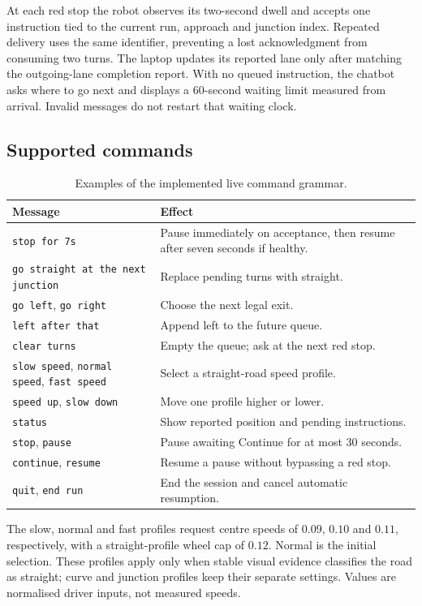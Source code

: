 \documentclass[10pt,a4paper,twocolumn]{article}
\newcommand{\code}[1]{\texttt{#1}}
\begin{document}
At each red stop the robot observes its two-second dwell and accepts one
instruction tied to the current run, approach and junction index. Repeated
delivery uses the same identifier, preventing a lost acknowledgment from
consuming two turns. The laptop updates its reported lane only after matching
the outgoing-lane completion report. With no queued instruction, the chatbot
asks where to go next and displays a 60-second waiting limit measured from
arrival. Invalid messages do not restart that waiting clock.

\subsection{Supported commands}

\begin{table}[h]
\centering
\caption{Examples of the implemented live command grammar.}
\label{tab:chat}
\footnotesize
\begin{tabularx}{\columnwidth}{@{}p{}X@{}}
\toprule
Message & Effect \\
\midrule
\code{stop for 7s} & Pause immediately on acceptance, then resume after seven seconds if healthy. \\
\code{go straight at the next junction} & Replace pending turns with straight. \\
\code{go left}, \code{go right} & Choose the next legal exit. \\
\code{left after that} & Append left to the future queue. \\
\code{clear turns} & Empty the queue; ask at the next red stop. \\
\code{slow speed}, \code{normal speed}, \code{fast speed} & Select a straight-road speed profile. \\
\code{speed up}, \code{slow down} & Move one profile higher or lower. \\
\code{status} & Show reported position and pending instructions. \\
\code{stop}, \code{pause} & Pause awaiting Continue for at most 30 seconds. \\
\code{continue}, \code{resume} & Resume a pause without bypassing a red stop. \\
\code{quit}, \code{end run} & End the session and cancel automatic resumption. \\
\bottomrule
\end{tabularx}
\end{table}

The slow, normal and fast profiles request centre speeds of $0.09$, $0.10$ and
$0.11$, respectively, with a straight-profile wheel cap of $0.12$. Normal is
the initial selection. These profiles apply only when stable visual evidence
classifies the road as straight; curve and junction profiles keep their
separate settings. Values are normalised driver inputs, not measured speeds.
\end{document}

